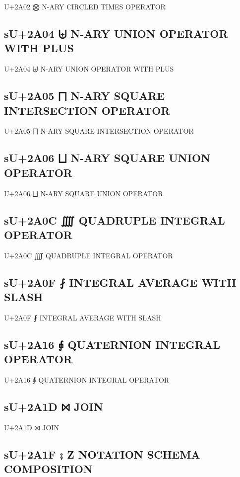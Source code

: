 U+2A02 ⨂ N-ARY CIRCLED TIMES OPERATOR

\subsection{sU+2A04 ⨄ N-ARY UNION OPERATOR WITH PLUS}

U+2A04 ⨄ N-ARY UNION OPERATOR WITH PLUS

\subsection{sU+2A05 ⨅ N-ARY SQUARE INTERSECTION OPERATOR}

U+2A05 ⨅ N-ARY SQUARE INTERSECTION OPERATOR

\subsection{sU+2A06 ⨆ N-ARY SQUARE UNION OPERATOR}

U+2A06 ⨆ N-ARY SQUARE UNION OPERATOR

\subsection{sU+2A0C ⨌ QUADRUPLE INTEGRAL OPERATOR}

U+2A0C ⨌ QUADRUPLE INTEGRAL OPERATOR

\subsection{sU+2A0F ⨏ INTEGRAL AVERAGE WITH SLASH}

U+2A0F ⨏ INTEGRAL AVERAGE WITH SLASH

\subsection{sU+2A16 ⨖ QUATERNION INTEGRAL OPERATOR}

U+2A16 ⨖ QUATERNION INTEGRAL OPERATOR

\subsection{sU+2A1D ⨝ JOIN}

U+2A1D ⨝ JOIN

\subsection{sU+2A1F ⨟ Z NOTATION SCHEMA COMPOSITION}

